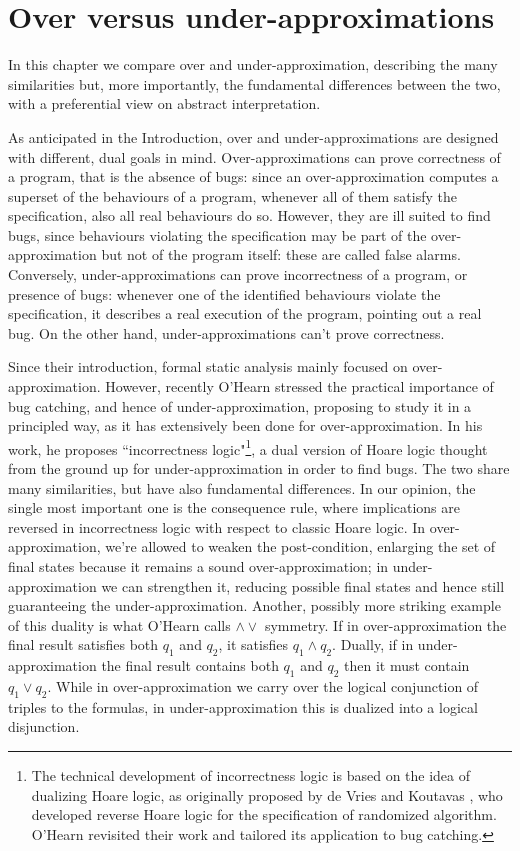 \chapter{Over versus under-approximations}\label{ch3:comparison}
In this chapter we compare over and under-approximation, describing the many similarities but, more importantly, the fundamental differences between the two, with a preferential view on abstract interpretation.

As anticipated in the Introduction, over and under-approximations are designed with different, dual goals in mind.
Over-approximations can prove correctness of a program, that is the absence of bugs: since an over-approximation computes a superset of the behaviours of a program, whenever all of them satisfy the specification, also all real behaviours do so. However, they are ill suited to find bugs, since behaviours violating the specification may be part of the over-approximation but not of the program itself: these are called false alarms.
Conversely, under-approximations can prove incorrectness of a program, or presence of bugs: whenever one of the identified behaviours violate the specification, it describes a real execution of the program, pointing out a real bug. On the other hand, under-approximations can't prove correctness.

Since their introduction, formal static analysis mainly focused on over-approximation. However, recently O'Hearn \cite{ohearn-incorrectness-logic} stressed the practical importance of bug catching, and hence of under-approximation, proposing to study it in a principled way, as it has extensively been done for over-approximation.
In his work, he proposes ``incorrectness logic"\footnote{The technical development of incorrectness logic is based on the idea of dualizing Hoare logic, as originally proposed by de Vries and Koutavas \cite{de-vries-koutavas-reverse-hoare-logic}, who developed reverse Hoare logic for the specification of randomized algorithm. O'Hearn revisited their work and tailored its application to bug catching.}, a dual version of Hoare logic thought from the ground up for under-approximation in order to find bugs. The two share many similarities, but have also fundamental differences. In our opinion, the single most important one is the consequence rule, where implications are reversed in incorrectness logic with respect to classic Hoare logic. In over-approximation, we're allowed to weaken the post-condition, enlarging the set of final states because it remains a sound over-approximation; in under-approximation we can strengthen it, reducing possible final states and hence still guaranteeing the under-approximation.
Another, possibly more striking example of this duality is what O'Hearn calls $\land \lor$ symmetry. If in over-approximation the final result satisfies both $q_1$ and $q_2$, it satisfies $q_1 \land q_2$. Dually, if in under-approximation the final result contains both $q_1$ and $q_2$ then it must contain $q_1 \lor q_2$. While in over-approximation we carry over the logical conjunction of triples to the formulas, in under-approximation this is dualized into a logical disjunction.

